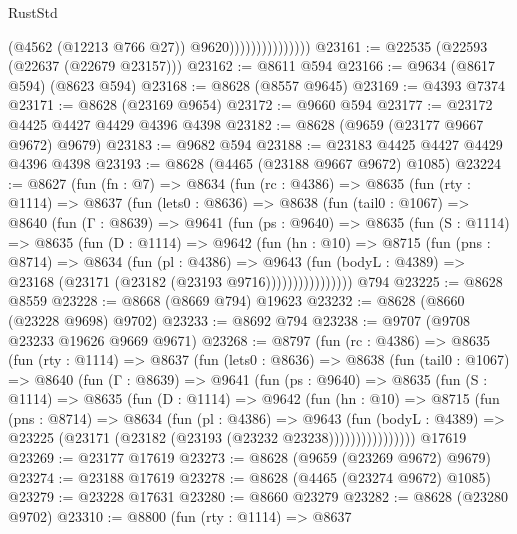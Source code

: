 \begin{lexlean}{RustStd}
\begin{coremodule}
                                  (@4562 (@12213 @766 @27))
                                  @9620)))))))))))))))
@23161 := @22535 (@22593 (@22637 (@22679 @23157)))
@23162 := @8611 @594
@23166 := @9634 (@8617 @594) (@8623 @594)
@23168 := @8628 (@8557 @9645)
@23169 := @4393 @7374
@23171 := @8628 (@23169 @9654)
@23172 := @9660 @594
@23177 := @23172 @4425 @4427 @4429 @4396 @4398
@23182 := @8628 (@9659 (@23177 @9667 @9672) @9679)
@23183 := @9682 @594
@23188 := @23183 @4425 @4427 @4429 @4396 @4398
@23193 := @8628 (@4465 (@23188 @9667 @9672) @1085)
@23224 := @8627
    (fun (fn : @7) =>
    @8634
      (fun (rc : @4386) =>
      @8635
        (fun (rty : @1114) =>
        @8637
          (fun (lets0 : @8636) =>
          @8638
            (fun (tail0 : @1067) =>
            @8640
              (fun (Γ : @8639) =>
              @9641
                (fun (ps : @9640) =>
                @8635
                  (fun (S : @1114) =>
                  @8635
                    (fun (D : @1114) =>
                    @9642
                      (fun (hn : @10) =>
                      @8715
                        (fun (pns : @8714) =>
                        @8634
                          (fun (pl : @4386) =>
                          @9643
                            (fun (bodyL : @4389) =>
                            @23168 (@23171 (@23182 (@23193 @9716))))))))))))))))
    @794
@23225 := @8628 @8559
@23228 := @8668 (@8669 @794) @19623
@23232 := @8628 (@8660 (@23228 @9698) @9702)
@23233 := @8692 @794
@23238 := @9707 (@9708 @23233 @19626 @9669 @9671)
@23268 := @8797
    (fun (rc : @4386) =>
    @8635
      (fun (rty : @1114) =>
      @8637
        (fun (lets0 : @8636) =>
        @8638
          (fun (tail0 : @1067) =>
          @8640
            (fun (Γ : @8639) =>
            @9641
              (fun (ps : @9640) =>
              @8635
                (fun (S : @1114) =>
                @8635
                  (fun (D : @1114) =>
                  @9642
                    (fun (hn : @10) =>
                    @8715
                      (fun (pns : @8714) =>
                      @8634
                        (fun (pl : @4386) =>
                        @9643
                          (fun (bodyL : @4389) =>
                          @23225 (@23171 (@23182 (@23193 (@23232 @23238))))))))))))))))
    @17619
@23269 := @23177 @17619
@23273 := @8628 (@9659 (@23269 @9672) @9679)
@23274 := @23188 @17619
@23278 := @8628 (@4465 (@23274 @9672) @1085)
@23279 := @23228 @17631
@23280 := @8660 @23279
@23282 := @8628 (@23280 @9702)
@23310 := @8800
    (fun (rty : @1114) =>
    @8637

\end{coremodule}
\end{lexlean}
